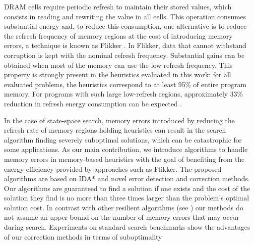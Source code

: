  DRAM cells require periodic refresh to maintain their stored values, which consists in reading and rewriting the value in all cells. This operation consumes substantial energy and, to reduce this consumption, one alternative is to reduce the refresh frequency of memory regions 
 at the cost of introducing memory errors, a 
  technique is known as Flikker 
\cite{Liu:2011:FSD:1950365.1950391}. %
In Flikker, data that cannot withstand corruption is kept with the nominal refresh frequency. %
%
Substantial gains can be obtained when most of the memory can use the low refresh frequency. This property is strongly present in the heuristics evaluated in this work: for all evaluated problems, the heuristics correspond to at least 95\% of entire program memory. For programs with such large low-refresh regions, approximately 33\% reduction in refresh energy consumption can be expected \cite{Liu:2011:FSD:1950365.1950391}. 

In the case of state-space search, memory errors introduced by reducing the refresh rate of memory regions holding heuristics can result in the search algorithm finding 
severely suboptimal solutions, which can be catastrophic for some applications. As our main contribution, we introduce algorithms to handle memory errors in memory-based heuristics with the goal of benefiting from the energy efficiency provided by approaches such as Flikker. 
The proposed algorithms are based on IDA* and novel error detection and correction methods. Our algorithms are guaranteed to find a solution if one exists and the cost of the solution they find is no more than three times larger than the problem's optimal solution cost. In contrast with other resilient algorithms (see \cite{finocchi2007designing}) our methods do not assume an upper bound on the number of memory errors that may occur during search. Experiments on standard search benchmarks show the advantages of our correction methods in terms of suboptimality

